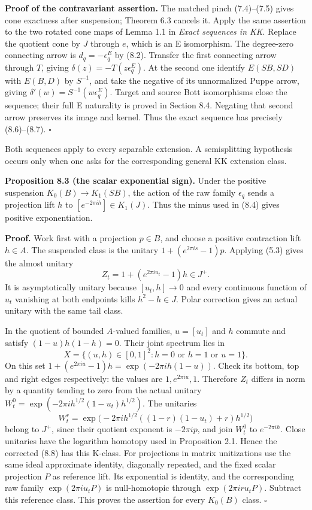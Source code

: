 \documentclass[
  11pt,
]{article}
\begin{document}
\textbf{Proof of the contravariant assertion.} The matched pinch
(7.4)--(7.5) gives cone exactness after suspension; Theorem 6.3 cancels
it. Apply the same assertion to the two rotated cone maps of Lemma 1.1
in \emph{Exact sequences in KK}. Replace the quotient cone by \(J\)
through \(e\), which is an E isomorphism. The degree-zero connecting
arrow is \(d_q=-\epsilon_q^E\) by (8.2). Transfer the first connecting
arrow through \(T\), giving \(\delta(z)=-T(z\epsilon_q^E)\). At the
second one identify \(E(SB,SD)\) with \(E(B,D)\) by \(S^{-1}\), and take
the negative of its unnormalized Puppe arrow, giving
\(\delta'(w)=S^{-1}(w\epsilon_q^E)\). Target and source Bott
isomorphisms close the sequence; their full E naturality is proved in
Section 8.4. Negating that second arrow preserves its image and kernel.
Thus the exact sequence has precisely (8.6)--(8.7). \(\square\)

Both sequences apply to every separable extension. A semisplitting
hypothesis occurs only when one asks for the corresponding general KK
extension class.

\textbf{Proposition 8.3 (the scalar exponential sign).} Under the
positive suspension \(K_0(B)\to K_1(SB)\), the action of the raw family
\(\epsilon_q\) sends a projection lift \(h\) to
\([e^{-2\pi ih}]\in K_1(J)\). Thus the minus used in (8.4) gives
positive exponentiation.

\textbf{Proof.} Work first with a projection \(p\in B\), and choose a
positive contraction lift \(h\in A\). The suspended class is the unitary
\(1+(e^{2\pi is}-1)p\). Applying (5.3) gives the almost unitary \[
Z_t=1+(e^{2\pi iu_t}-1)h\in J^+.
\tag{8.8}
\] It is asymptotically unitary because \([u_t,h]\to0\) and every
continuous function of \(u_t\) vanishing at both endpoints kills
\(h^2-h\in J\). Polar correction gives an actual unitary with the same
tail class.

In the quotient of bounded \(A\)-valued families, \(u=[u_t]\) and \(h\)
commute and satisfy \((1-u)h(1-h)=0\). Their joint spectrum lies in \[
X=\{(u,h)\in[0,1]^2:h=0\text{ or }h=1\text{ or }u=1\}.
\tag{8.9}
\] On this set \(1+(e^{2\pi iu}-1)h=\exp(-2\pi ih(1-u))\). Check its
bottom, top and right edges respectively: the values are
\(1,e^{2\pi iu},1\). Therefore \(Z_t\) differs in norm by a quantity
tending to zero from the actual unitary
\(W_t^0=\exp(-2\pi i h^{1/2}(1-u_t)h^{1/2})\). The unitaries \[
W_t^r=\exp\bigl(-2\pi i h^{1/2}((1-r)(1-u_t)+r)h^{1/2}\bigr)
\tag{8.10}
\] belong to \(J^+\), since their quotient exponent is \(-2\pi ip\), and
join \(W_t^0\) to \(e^{-2\pi ih}\). Close unitaries have the logarithm
homotopy used in Proposition 2.1. Hence the corrected (8.8) has this
K-class. For projections in matrix unitizations use the same ideal
approximate identity, diagonally repeated, and the fixed scalar
projection \(P\) as reference lift. Its exponential is identity, and the
corresponding raw family \(\exp(2\pi iu_tP)\) is null-homotopic through
\(\exp(2\pi iru_tP)\). Subtract this reference class. This proves the
assertion for every \(K_0(B)\) class. \(\square\)
\end{document}
